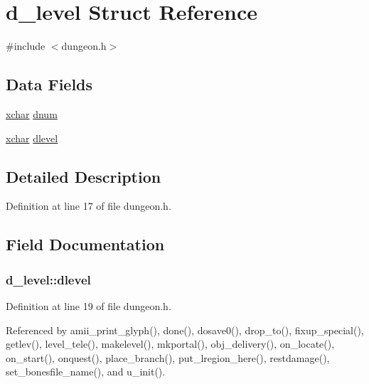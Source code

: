 \hypertarget{structd__level}{\section{d\+\_\+level Struct Reference}
\label{structd__level}
}


{\ttfamily \#include $<$dungeon.\+h$>$}

\subsection*{Data Fields}
\begin{DoxyCompactItemize}
\item 
\hyperlink{global_8h_a2043b7d01ce89f4ee2fa6c345a752d32}{xchar} \hyperlink{structd__level_a035d301f0a8cafc6c757fbbda2b6935e}{dnum}
\item 
\hyperlink{global_8h_a2043b7d01ce89f4ee2fa6c345a752d32}{xchar} \hyperlink{structd__level_a7878568dc81a7efd40bea0206dbd109d}{dlevel}
\end{DoxyCompactItemize}


\subsection{Detailed Description}


Definition at line 17 of file dungeon.\+h.



\subsection{Field Documentation}
\hypertarget{structd__level_a7878568dc81a7efd40bea0206dbd109d}{
\subsubsection[{dlevel}]{ d\+\_\+level\+::dlevel}}\label{structd__level_a7878568dc81a7efd40bea0206dbd109d}


Definition at line 19 of file dungeon.\+h.



Referenced by amii\+\_\+print\+\_\+glyph(), done(), dosave0(), drop\+\_\+to(), fixup\+\_\+special(), getlev(), level\+\_\+tele(), makelevel(), mkportal(), obj\+\_\+delivery(), on\+\_\+locate(), on\+\_\+start(), onquest(), place\+\_\+branch(), put\+\_\+lregion\+\_\+here(), restdamage(), set\+\_\+bonesfile\+\_\+name(), and u\+\_\+init().

